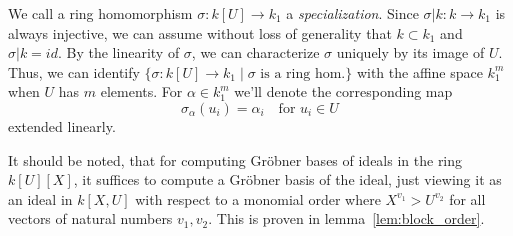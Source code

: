 We call a ring homomorphism $\sigma : k[U] \to k_{1}$ a \textit{specialization}. Since $\sigma|k : k \to k_{1}$ is always injective, we can assume without loss of generality that $k \subset k_{1}$ and $\sigma|k = id$. By the linearity of $\sigma$, we can characterize $\sigma$ uniquely by its image of $U$. Thus, we can identify $\{\sigma : k[U] \to k_{1} \mid \sigma \text{ is a ring hom.}\}$ with the affine space $k_{1}^{m}$ when $U$ has $m$ elements. For $\alpha \in k_{1}^{m}$ we'll denote the corresponding map
\[\sigma_{\alpha}(u_{i}) = \alpha_{i} \quad \text{for $u_{i} \in U$}\] extended linearly.

It should be noted, that for computing Gröbner bases of ideals in the ring $k[U][X]$, it suffices to compute a Gröbner basis of the ideal, just viewing it as an ideal in $k[X, U]$ with respect to a monomial order where $X^{v_{1}} > U^{v_{2}}$ for all vectors of natural numbers $v_{1}, v_{2}$. This is proven in lemma~\ref{lem:block_order}.

